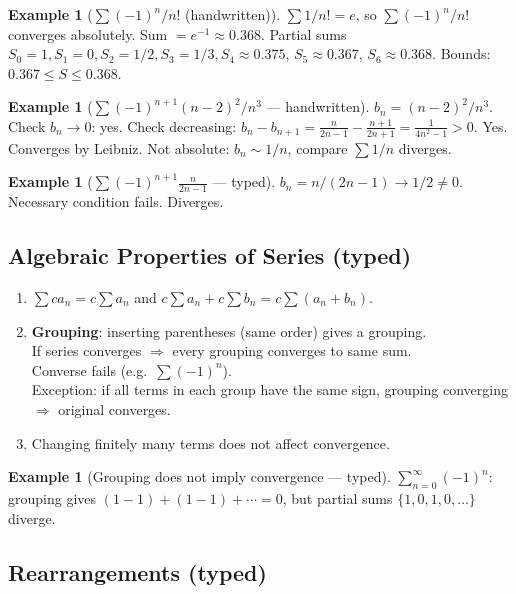 \documentclass[12pt, a4paper]{article}
\theoremstyle{definition}
\newtheorem{example}[theorem]{Example}
\theoremstyle{remark}
\begin{document}
\begin{example}[$\sum (-1)^n/n!$ (handwritten)]
$\sum 1/n! = e$, so $\sum (-1)^n/n!$ converges absolutely. Sum $= e^{-1} \approx 0.368$.
Partial sums $S_0=1, S_1=0, S_2=1/2, S_3=1/3, S_4\approx0.375$, $S_5\approx0.367$, $S_6\approx0.368$.
Bounds: $0.367 \leq S \leq 0.368$. \checkmark
\end{example}

\begin{example}[$\sum (-1)^{n+1}(n-2)^2/n^3$ --- handwritten]
$b_n = (n-2)^2/n^3$. Check $b_n \to 0$: yes. Check decreasing:
$b_n - b_{n+1} = \frac{n}{2n-1} - \frac{n+1}{2n+1} = \frac{1}{4n^2-1} > 0$. Yes.
Converges by Leibniz. Not absolute: $b_n \sim 1/n$, compare $\sum 1/n$ diverges.
\end{example}

\begin{example}[$\sum (-1)^{n+1} \frac{n}{2n-1}$ --- typed]
$b_n = n/(2n-1) \to 1/2 \neq 0$. Necessary condition fails. Diverges.
\end{example}

\subsection{Algebraic Properties of Series (typed)}

\begin{enumerate}
  \item $\sum c a_n = c \sum a_n$ and $c\sum a_n + c\sum b_n = c\sum(a_n+b_n)$.
  \item \textbf{Grouping}: inserting parentheses (same order) gives a grouping. \\
        If series converges $\Rightarrow$ every grouping converges to same sum. \\
        Converse fails (e.g.\ $\sum(-1)^n$). \\
        Exception: if all terms in each group have the same sign, grouping converging $\Rightarrow$ original converges.
  \item Changing finitely many terms does not affect convergence.
\end{enumerate}

\begin{example}[Grouping does not imply convergence --- typed]
$\sum_{n=0}^\infty(-1)^n$: grouping gives $(1-1)+(1-1)+\cdots = 0$, but partial sums $\{1,0,1,0,\ldots\}$ diverge.
\end{example}

\subsection{Rearrangements (typed)}
\end{document}
